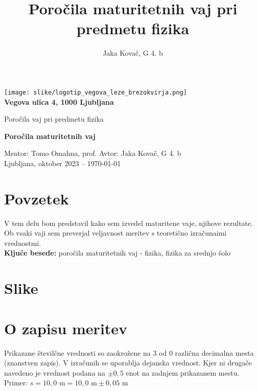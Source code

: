 \documentclass[12pt]{article}
\title{Poročila maturitetnih vaj pri predmetu fizika}
\author{Jaka Kovač, G 4. b}
\begin{document}

\begin{center}
	\thispagestyle{empty}
	\texttt{[image: slike/logotip\_vegova\_leze\_brezokvirja.png]}
	\\
	\textbf{Vegova ulica 4, 1000 Ljubljana}

	\vspace{\fill} 
	Poročila vaj pri predmetu fizika

	\Huge{\textbf{Poročila maturitetnih vaj}}

	\normalsize
	\vspace{\fill}

	Mentor: Tomo Omahna, prof. \hfill Avtor: Jaka Kovač, G 4. b\\
	\null
	Ljubljana, oktober 2023 – \MMYYYYdate\today %
\end{center}
\newpage
\thispagestyle{empty}
\null
\newpage

\section*{Povzetek}
V tem delu bom predstavil kako sem izvedel maturitene vaje, njihove rezultate. Ob vsaki vaji
sem preverjal veljavnost meritev s teoretično izračunaimi vrednostmi.
\\ %
\textbf{Ključe besede:} poročila maturitetnih vaj - fizika, fizika za srednjo šolo

\vfill

\newpage
\thispagestyle{empty} %
\tableofcontents %

\begingroup     %
\makeatletter
\section*{Slike}
\let\clearpage\relax
\makeatother
\endgroup


\newpage

\section*{O zapisu meritev}
Prikazane številčne vrednosti so zaokrožene na 3 od 0 različna decimalna mesta (znanstven zapis).
V izračunih se uporablja dejanska vrednost. Kjer ni drugače navedeno je vrednost podana na
$\pm 0,5$ enot na zadnjem prikazanem mestu. Primer: $s = 10,0 \text{ m} = 10,0 \text{ m} \pm 0,05 \text{ m}$
\end{document}

